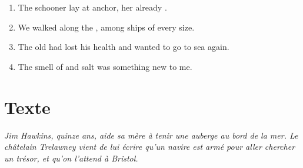 \documentclass{fiche}
\begin{document}
\begin{anglais}
\begin{enumerate}[label=\arabic*.,itemsep=2mm,leftmargin=*]
  \item The schooner lay at anchor, her  already .
  \item We walked along the , among ships of every size.
  \item The old  had lost his health  and wanted to go to sea again.
  \item The smell of  and salt was something new to me.
\end{enumerate}
\end{anglais}

\newpage
\section{Texte}

\noindent\small\textit{Jim Hawkins, quinze ans, aide sa mère à tenir une auberge au bord de
la mer. Le châtelain Trelawney vient de lui écrire qu'un navire est armé pour aller chercher
un trésor, et qu'on l'attend à Bristol.}\normalsize
\end{document}
